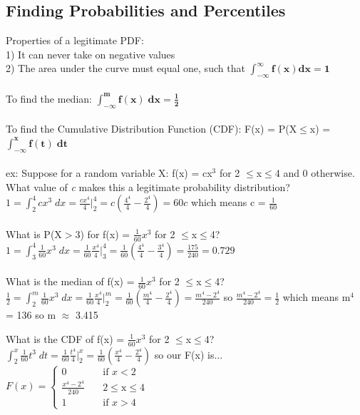 \documentclass[12pt, a4paper]{article}
\begin{document}
	\subsection{Finding Probabilities and Percentiles}
	Properties of a legitimate PDF: \\
	1) It can never take on negative values \\
	2) The area under the curve must equal one, such that $\mathbf{\int_{-\infty}^{\infty} f(x)dx = 1}$ \\~\\
	To find the median: $\mathbf{\int_{-\infty}^{m}f(x)\;dx = \frac{1}{2}}$ \\~\\
	To find the Cumulative Distribution Function (CDF): F(x) = P(X$\leq$x) = $\mathbf{\int_{-\infty}^{x}f(t)\;dt}$ \\~\\
	ex: Suppose for a random variable X: f(x) = cx$^3$ for 2 $\leq$x$\leq$4 and 0 otherwise. What value of \textit{c} makes this a legitimate probability distribution? \\
	$1= \int_{2}^{4} cx^3\; dx = \frac{cx^4}{4} \bigr|_2^4 = c(\frac{4^4}{4}-\frac{2^4}{4}) = 60c$ which means c = $\frac{1}{60}$ \\~\\
	What is P(X$>$3) for f(x) = $\frac{1}{60}x^3$ for 2 $\leq$x$\leq$4? \\
	$1 = \int_{3}^{4}\frac{1}{60}x^3\; dx = \frac{1}{60}\frac{x^4}{4} \bigr|_3^4 = \frac{1}{60}(\frac{4^4}{4}-\frac{3^4}{4}) = \frac{175}{240} = 0.729$ \\~\\
	What is the median of f(x) = $\frac{1}{60}x^3$ for 2 $\leq$x$\leq$4? \\
	$\frac{1}{2} = \int_{2}^{m}\frac{1}{60}x^3\; dx = \frac{1}{60}\frac{x^4}{4} \bigr|_2^m = \frac{1}{60}(\frac{m^4}{4}-\frac{2^4}{4}) = \frac{m^4 - 2^4}{240}$ so $\frac{m^4 - 2^4}{240} = \frac{1}{2}$ which means m$^4$ = 136 so m $\approx$ 3.415 \newpage
	
	\noindent What is the CDF of f(x) = $\frac{1}{60}x^3$ for 2 $\leq$x$\leq$4? \\
	$\int_2^x \frac{1}{60}t^3\;dt = \frac{1}{60}\frac{t^4}{4}\bigr|_2^x = \frac{1}{60}(\frac{x^4}{4}-\frac{2^4}{4})$ so our F(x) is... \\
	$ F(x) =
		\begin{cases}
		0   & \quad \text{if } x<2\\
		\frac{x^4 - 2^4}{240}   & \quad \text{2$\leq$x$\leq$4}\\
		1	& \quad \text{if } x>4
		\end{cases}$ \\~\\
		
\end{document}
